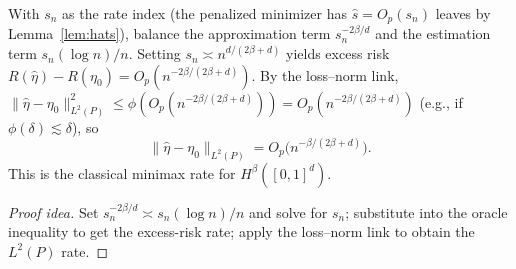 \documentclass[12pt]{article}
\begin{document}
\begin{lemma}
\label{lem:optimal-sn}
With $s_n$ as the rate index (the penalized minimizer has $\hat{s} = O_p(s_n)$ leaves by Lemma~\ref{lem:hats}), balance the approximation term $s_n^{-2\beta/d}$ and the estimation term $s_n (\log n)/n$. Setting $s_n \asymp n^{d/(2\beta+d)}$ yields excess risk $R(\hat\eta) - R(\eta_0) = O_p(n^{-2\beta/(2\beta+d)})$. By the loss--norm link, $\|\hat\eta - \eta_0\|_{L^2(P)}^2 \le \phi(O_p(n^{-2\beta/(2\beta+d)})) = O_p(n^{-2\beta/(2\beta+d)})$ (e.g., if $\phi(\delta) \lesssim \delta$), so
\[
\|\hat\eta - \eta_0\|_{L^2(P)} = O_p\bigl( n^{-\beta/(2\beta+d)} \bigr).
\]
This is the classical minimax rate for $H^\beta([0,1]^d)$.
\end{lemma}
\begin{proof}[Proof idea]
Set $s_n^{-2\beta/d} \asymp s_n (\log n)/n$ and solve for $s_n$; substitute into the oracle inequality to get the excess-risk rate; apply the loss--norm link to obtain the $L^2(P)$ rate.
\end{proof}
\end{document}
